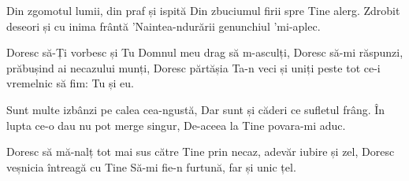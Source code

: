 
\beginverse
Din zgomotul lumii, din praf și ispită
Din zbuciumul firii spre Tine alerg.
Zdrobit deseori și cu inima frântă
’Naintea-ndurării genunchiul ’mi-aplec.
\endverse

\beginchorus
Doresc să-Ți vorbesc și Tu Domnul meu drag să m-asculți,
Doresc să-mi răspunzi, prăbușind ai necazului munți,
Doresc părtășia Ta-n veci și uniți
peste tot ce-i vremelnic să fim:
Tu și eu.
\endchorus

\beginverse
Sunt multe izbânzi pe calea cea-ngustă,
Dar sunt și căderi ce sufletul frâng.
În lupta ce-o dau nu pot merge singur,
De-aceea la Tine povara-mi aduc.
\endverse

\beginverse
Doresc să mă-nalț tot mai sus către Tine
prin necaz, adevăr iubire și zel,
Doresc veșnicia întreagă cu Tine
Să-mi fie-n furtună, far și unic țel.
\endverse

\endsong